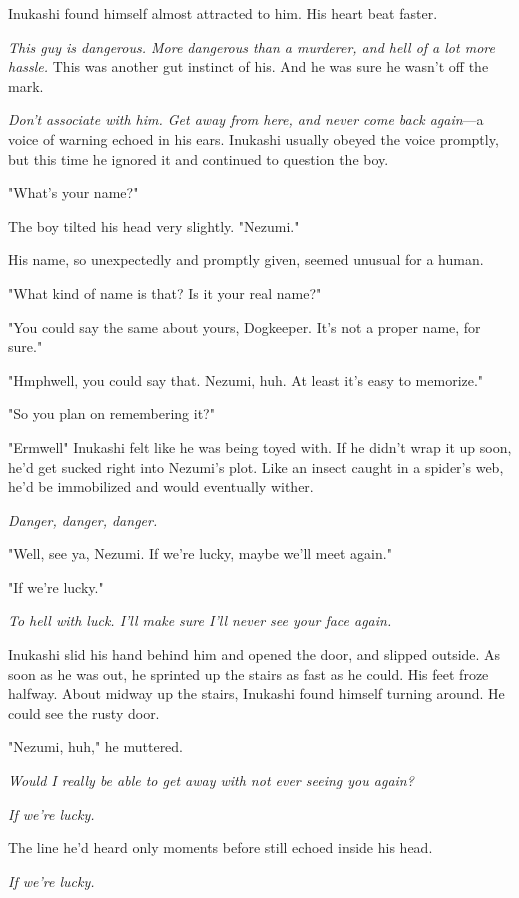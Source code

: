 Inukashi found himself almost attracted to him. His heart beat faster.

\emph{This guy is dangerous. More dangerous than a murderer, and hell of a lot
more hassle.} This was another gut instinct of his. And he was sure he
wasn't off the mark.

\emph{Don't associate with him. Get away from here, and never come back
again}---a voice of warning echoed in his ears. Inukashi usually obeyed the
voice promptly, but this time he ignored it and continued to question
the boy.

"What's your name?"

The boy tilted his head very slightly. "Nezumi."

His name, so unexpectedly and promptly given, seemed unusual for a
human.

"What kind of name is that? Is it your real name?"

"You could say the same about yours, Dogkeeper. It's not a proper name,
for sure."

"Hmph\el well, you could say that. Nezumi, huh. At least it's easy to
memorize."

"So you plan on remembering it?"

"Erm\el well\el " Inukashi felt like he was being toyed with. If he
didn't wrap it up soon, he'd get sucked right into Nezumi's plot. Like
an insect caught in a spider's web, he'd be immobilized and would
eventually wither.

\emph{Danger, danger, danger.}

"Well, see ya, Nezumi. If we're lucky, maybe we'll meet again."

"If we're lucky."

\emph{To hell with luck. I'll make sure I'll never see your face again.}

Inukashi slid his hand behind him and opened the door, and slipped
outside. As soon as he was out, he sprinted up the stairs as fast as he
could. His feet froze halfway. About midway up the stairs, Inukashi
found himself turning around. He could see the rusty door.

"Nezumi, huh," he muttered.

\emph{Would I really be able to get away with not ever seeing you again?}

\emph{If we're lucky.}

The line he'd heard only moments before still echoed inside his head.

\emph{If we're lucky.}

